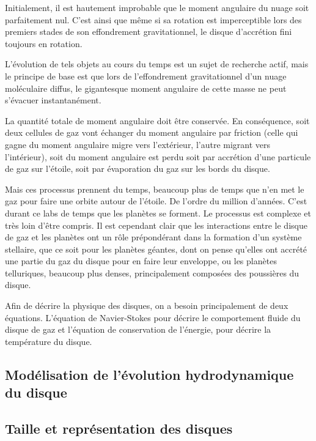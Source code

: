 Initialement, il est hautement improbable que le moment angulaire du nuage soit parfaitement nul. C'est ainsi que même si sa rotation est imperceptible lors des premiers stades de son effondrement gravitationnel, le disque d'accrétion fini toujours en rotation. 

\bigskip

L'évolution de tels objets au cours du temps est un sujet de recherche actif, mais le principe de base est que lors de l'effondrement gravitationnel d'un nuage moléculaire diffus, le gigantesque moment angulaire de cette masse ne peut s'évacuer instantanément. 

La quantité totale de moment angulaire doit être conservée. En conséquence, soit deux cellules de gaz vont échanger du moment angulaire par friction (celle qui gagne du moment angulaire migre vers l'extérieur, l'autre migrant vers l'intérieur), soit du moment angulaire est perdu soit par accrétion d'une particule de gaz sur l'étoile, soit par évaporation du gaz sur les bords du disque.

Mais ces processus prennent du temps, beaucoup plus de temps que n'en met le gaz pour faire une orbite autour de l'étoile. De l'ordre du million d'années. C'est durant ce labs de temps que les planètes se forment. Le processus est complexe et très loin d'être compris. Il est cependant clair que les interactions entre le disque de gaz et les planètes ont un rôle prépondérant dans la formation d'un système stellaire, que ce soit pour les planètes géantes, dont on pense qu'elles ont accrété une partie du gaz du disque pour en faire leur enveloppe, ou les planètes telluriques, beaucoup plus denses, principalement composées des poussières du disque.

\bigskip

Afin de décrire la physique des disques, on a besoin principalement de deux équations. L'équation de Navier-Stokes pour décrire le comportement fluide du disque de gaz et l'équation de conservation de l'énergie, pour décrire la température du disque.

\subsection{Modélisation de l'évolution hydrodynamique du disque}

\subsection{Taille et représentation des disques}%

